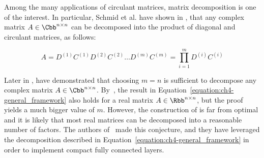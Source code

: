 %
%
%
%
Among the many applications of circulant matrices, matrix decomposition is one of the interest.
In particular, Schmid et al. have shown in \cite{muller1998algorithmic,schmid2000decomposing}, that any complex matrix $A \in \Cbb^{n\times n}$ can be decomposed into the product of diagonal and circulant matrices, as follows: 

\begin{equation}
  A = D^{(1)} C^{(1)} D^{(2)} C^{(2)} \dots D^{(m)} C^{(m)} = \prod_{i=1}^{m} D^{(i)} C^{(i)}
  \label{equation:ch4-general_framework}
\end{equation}

Later in \cite{huhtanen2015factoring}, \citeauthor{huhtanen2015factoring} have demonstrated that choosing $m=n$ is sufficient to decompose any complex matrix $A \in \Cbb^{n\times n}$.
By~\citet{schmid2000decomposing}, the result in Equation~\ref{equation:ch4-general_framework} also holds for a real matrix $A \in \Rbb^{n\times n}$, but the proof yields a much bigger value of $m$.
However,  the construction of \cite{schmid2000decomposing} is far from optimal and it is likely that most real matrices can be decomposed into a reasonable number of factors.
The authors of~\cite{moczulski2016acdc} made this conjecture, and they have leveraged the decomposition described in Equation~\ref{equation:ch4-general_framework} in order to implement compact fully connected layers.

